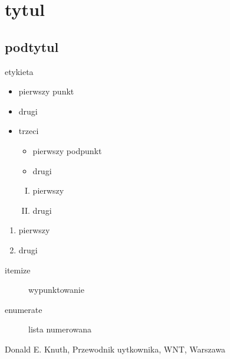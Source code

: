 \documentclass{article}
\begin{document}
\tableofcontents
\section{tytul}
\subsection{podtytul}

\cite{dote:ks} etykieta

\begin{itemize}
	\item pierwszy punkt
	\item drugi 
	\item trzeci
	
	\begin{itemize}
		\item pierwszy podpunkt
		\item drugi
\end{itemize}
	
	\begin{enumerate}[I)]
		\item pierwszy 
		\item drugi
	\end{enumerate}
	
\end{itemize}

	\begin{enumerate}
		\item pierwszy 
		\item drugi
	\end{enumerate}

\begin{description}
	\item [itemize] wypunktowanie
	\item [enumerate] lista numerowana
\end{description}

\begin{thebibliography}{1}
	 Donald E. Knuth, Przewodnik uytkownika, WNT, Warszawa
\end{thebibliography}
\end{document}
